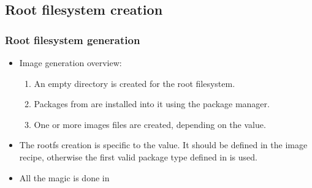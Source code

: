 \subsection{Root filesystem creation}

\begin{frame}
  \frametitle{Root filesystem generation}
  \begin{itemize}
    \item Image generation overview:
      \begin{enumerate}
        \item An empty directory is created for the root filesystem.
        \item Packages from  are installed into it
          using the package manager.
        \item One or more images files are created, depending on the
           value.
      \end{enumerate}
    \item The rootfs creation is specific to the 
      value. It should be defined in the image recipe, otherwise the
      first valid package type defined in  is
      used.
    \item All the magic is done in
  \end{itemize}
\end{frame}
